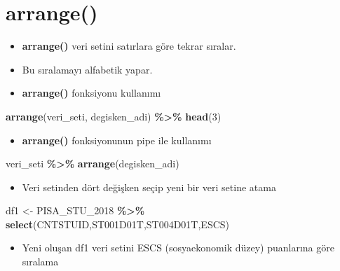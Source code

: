 \documentclass[
  oneside]{book}
\newenvironment{Shaded}{\begin{snugshade}}{\end{snugshade}}
\newcommand{\DecValTok}[1]{\textcolor[rgb]{0.00,0.00,0.81}{#1}}
\newcommand{\FunctionTok}[1]{\textcolor[rgb]{0.13,0.29,0.53}{\textbf{#1}}}
\newcommand{\NormalTok}[1]{#1}
\newcommand{\OtherTok}[1]{\textcolor[rgb]{0.56,0.35,0.01}{#1}}
\newcommand{\SpecialCharTok}[1]{\textcolor[rgb]{0.81,0.36,0.00}{\textbf{#1}}}
\providecommand{\tightlist}{%
  \setlength{\itemsep}{0pt}\setlength{\parskip}{0pt}}
\begin{document}
\hypertarget{arrange}{%
\section{\texorpdfstring{\textbf{arrange()}}{arrange()}}\label{arrange}}

\begin{itemize}
\item
  \textbf{arrange()} veri setini satırlara göre tekrar sıralar.
\item
  Bu sıralamayı alfabetik yapar.
\item
  \textbf{arrange()} fonksiyonu kullanımı
\end{itemize}

\begin{Shaded}
\begin{Highlighting}[]
\FunctionTok{arrange}\NormalTok{(veri\_seti, degisken\_adi) }\SpecialCharTok{\%\textgreater{}\%} \FunctionTok{head}\NormalTok{(}\DecValTok{3}\NormalTok{)}
\end{Highlighting}
\end{Shaded}

\begin{itemize}
\tightlist
\item
  \textbf{arrange()} fonksiyonunun pipe ile kullanımı
\end{itemize}

\begin{Shaded}
\begin{Highlighting}[]
\NormalTok{veri\_seti }\SpecialCharTok{\%\textgreater{}\%} \FunctionTok{arrange}\NormalTok{(degisken\_adi)}
\end{Highlighting}
\end{Shaded}

\begin{itemize}
\tightlist
\item
  Veri setinden dört değişken seçip yeni bir veri setine atama
\end{itemize}

\begin{Shaded}
\begin{Highlighting}[]
\NormalTok{df1 }\OtherTok{\textless{}{-}}\NormalTok{ PISA\_STU\_2018 }\SpecialCharTok{\%\textgreater{}\%} \FunctionTok{select}\NormalTok{(CNTSTUID,ST001D01T,ST004D01T,ESCS)}
\end{Highlighting}
\end{Shaded}

\begin{itemize}
\tightlist
\item
  Yeni oluşan df1 veri setini ESCS (sosyaekonomik düzey) puanlarına göre sıralama
\end{itemize}
\end{document}
